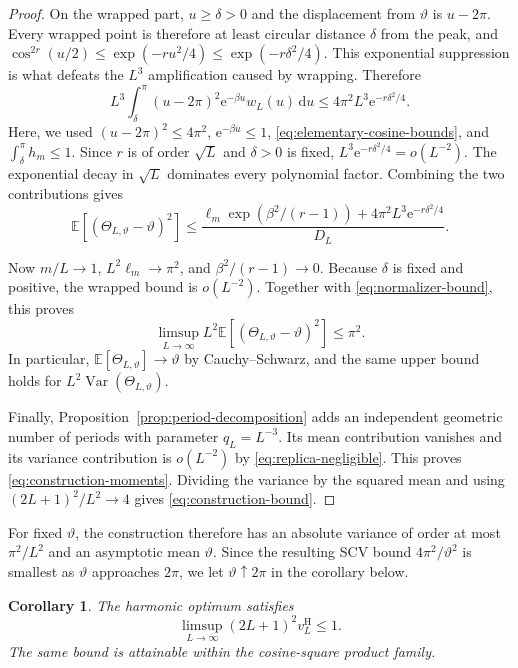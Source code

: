 \documentclass[11pt]{article}
\numberwithin{equation}{section}
\newtheorem{corollary}[theorem]{Corollary}
\theoremstyle{remark}
\newcommand{\E}{\mathbb E}
\newcommand{\Var}{\operatorname{Var}}
\newcommand{\e}{\mathrm e}
\newcommand{\dd}{\,\mathrm d}
\newcommand{\vH}{v^{\mathrm H}}
\begin{document}
\begin{proof}
On the wrapped part, $u\geq\delta>0$ and the displacement from $\vartheta$ is $u-2\pi$. Every wrapped point is therefore at least circular distance $\delta$ from the peak, and $\cos^{2r}(u/2)\leq\exp(-ru^2/4)\leq\exp(-r\delta^2/4)$. This exponential suppression is what defeats the $L^3$ amplification caused by wrapping. Therefore
\[
  L^3\int_{\delta}^{\pi}(u-2\pi)^2\e^{-\beta u}w_L(u)\dd u
  \leq4\pi^2L^3\e^{-r\delta^2/4}.
\]
Here, we used $(u-2\pi)^2\leq4\pi^2$, $\e^{-\beta u}\leq1$, \eqref{eq:elementary-cosine-bounds}, and $\int_{\delta}^{\pi}h_m\leq1$. Since $r$ is of order $\sqrt L$ and $\delta>0$ is fixed, $L^3\e^{-r\delta^2/4}=o(L^{-2})$. The exponential decay in $\sqrt L$ dominates every polynomial factor. Combining the two contributions gives
\[
  \E\!\left[(\Theta_{L,\vartheta}-\vartheta)^2\right]
  \leq\frac{\ell_m\exp(\beta^2/(r-1))
                  +4\pi^2L^3\e^{-r\delta^2/4}}{D_L}.
\]

Now $m/L\to1$, $L^2\ell_m\to\pi^2$, and $\beta^2/(r-1)\to0$. Because $\delta$ is fixed and positive, the wrapped bound is $o(L^{-2})$. Together with \eqref{eq:normalizer-bound}, this proves
\[
  \limsup_{L\to\infty}
  L^2\E\!\left[(\Theta_{L,\vartheta}-\vartheta)^2\right]\leq\pi^2.
\]
In particular, $\E[\Theta_{L,\vartheta}]\to\vartheta$ by Cauchy--Schwarz, and the same upper bound holds for $L^2\Var(\Theta_{L,\vartheta})$.

Finally, Proposition~\ref{prop:period-decomposition} adds an independent geometric number of periods with parameter $q_L=L^{-3}$. Its mean contribution vanishes and its variance contribution is $o(L^{-2})$ by \eqref{eq:replica-negligible}. This proves \eqref{eq:construction-moments}. Dividing the variance by the squared mean and using $(2L+1)^2/L^2\to4$ gives \eqref{eq:construction-bound}.
\end{proof}

For fixed $\vartheta$, the construction therefore has an absolute variance of order at most $\pi^2/L^2$ and an asymptotic mean $\vartheta$. Since the resulting SCV bound $4\pi^2/\vartheta^2$ is smallest as $\vartheta$ approaches $2\pi$, we let $\vartheta\uparrow2\pi$ in the corollary below.
\begin{corollary}\label{cor:limsup}
The harmonic optimum satisfies
\begin{equation}\label{eq:limsup}
  \limsup_{L\to\infty}(2L+1)^2\vH_L\leq1.
\end{equation}
The same bound is attainable within the cosine-square product family.
\end{corollary}
\end{document}
